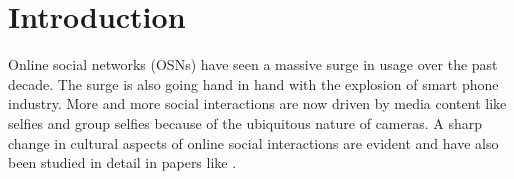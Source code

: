 \section{Introduction}
Online social networks (OSNs) have seen a massive surge in usage over the past decade. The surge is also going hand in hand with the explosion of smart phone industry. More and more social interactions are now driven by media content like selfies and group selfies because of the ubiquitous nature of cameras. A sharp change in cultural aspects of online social interactions are evident and have also been studied in detail in papers like \cite{Souza2015}.